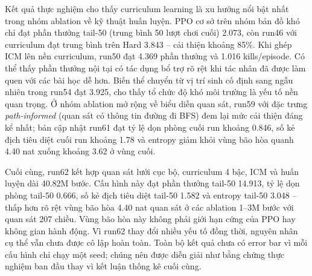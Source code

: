 Kết quả thực nghiệm cho thấy curriculum learning là xu hướng nổi bật nhất trong nhóm ablation về kỹ thuật huấn luyện. PPO cơ sở trên nhóm bản đồ khó chỉ đạt phần thưởng tail-50 (trung bình 50 lượt chơi cuối) 2.073, còn run46 với curriculum đạt trung bình trên Hard 3.843 -- cải thiện khoảng 85\%. Khi ghép ICM lên nền curriculum, run50 đạt 4.369 phần thưởng và 1.016 kills/episode. Có thể thấy phần thưởng nội tại có tác dụng bổ trợ rõ rệt khi tác nhân đã được làm quen với các bài học dễ hơn. Biến thể chuyển từ vị trí sinh cố định sang ngẫu nhiên trong run54 đạt 3.925, cho thấy tổ chức độ khó môi trường là yếu tố nền quan trọng. Ở nhóm ablation mở rộng về biểu diễn quan sát, run59 với đặc trưng \emph{path-informed} (quan sát có thông tin đường đi BFS) đem lại mức cải thiện đáng kể nhất; bản cập nhật run61 đạt tỷ lệ dọn phòng cuối run khoảng 0.846, số kẻ địch tiêu diệt cuối run khoảng 1.78 và entropy giảm khỏi vùng bão hòa quanh 4.40 nat xuống khoảng 3.62 ở vùng cuối.

Cuối cùng, run62 kết hợp quan sát lưới cục bộ, curriculum 4 bậc, ICM và huấn luyện dài 40.82M bước. Cấu hình này đạt phần thưởng tail-50 14.913, tỷ lệ dọn phòng tail-50 0.666, số kẻ địch tiêu diệt tail-50 1.582 và entropy tail-50 3.048 -- thấp hơn rõ rệt vùng bão hòa 4.40 nat quan sát ở các ablation 1--3M bước với quan sát 207 chiều. Vùng bão hòa này không phải giới hạn cứng của PPO hay không gian hành động. Vì run62 thay đổi nhiều yếu tố đồng thời, nguyên nhân cụ thể vẫn chưa được cô lập hoàn toàn. Toàn bộ kết quả chưa có error bar vì mỗi cấu hình chỉ chạy một seed; chúng nên được diễn giải như bằng chứng thực nghiệm ban đầu thay vì kết luận thống kê cuối cùng.

